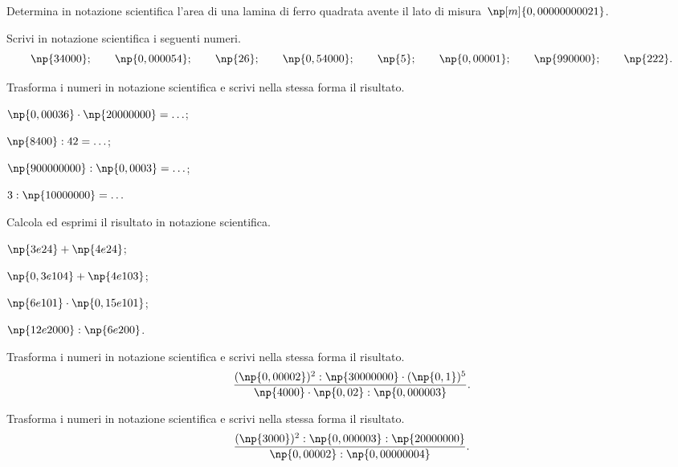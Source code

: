 \begin{esercizio}
 \label{ese:3.63}
Determina in notazione scientifica l'area di una lamina di ferro quadrata
avente il lato di misura~$\np[m]{0,00000000021}$.
\end{esercizio}

\begin{esercizio}
 \label{ese:3.64}
Scrivi in notazione scientifica i seguenti numeri.
\[\np{34000};\qquad\np{0,000054};\qquad\np{26};\qquad\np{0,54000};\qquad\np{5};\qquad\np{0,00001};\qquad\np{990000};\qquad\np{222}.\]
\end{esercizio}

\begin{esercizio}
 \label{ese:3.65}
Trasforma i numeri in notazione scientifica e scrivi nella stessa forma il risultato.
\begin{multicols}{2}
\begin{enumeratea}
\item $\np{0,00036}\cdot\np{20000000}=\ldots$;
\item $\np{8400}:42=\ldots$;
\item $\np{900000000}:\np{0,0003}=\ldots$;
\item $3:\np{10000000}=\ldots$
\end{enumeratea}
\end{multicols}
\end{esercizio}
\pagebreak
\begin{esercizio}
 \label{ese:3.66}
Calcola ed esprimi il risultato in notazione scientifica.
\begin{multicols}{2}
\begin{enumeratea}
\item $\np{3e24}+\np{4e24}$;
\item $\np{0,3e104}+\np{4e103}$;
\item $\np{6e101}\cdot\np{0,15e101}$;
\item $\np{12e2000}:\np{6e200}$.
\end{enumeratea}
\end{multicols}
\end{esercizio}

\begin{esercizio}[\Ast]
 \label{ese:3.67}
Trasforma i numeri in notazione scientifica e scrivi nella stessa forma il risultato.
\[\frac{(\np{0,00002})^2:\np{30000000} \cdot (\np{0,1})^5}{\np{4000} \cdot \np{0,02}:\np{0,000003}}.\]
\end{esercizio}

\begin{esercizio}[\Ast]
 \label{ese:3.68}
Trasforma i numeri in notazione scientifica e scrivi nella stessa forma il risultato.
\[\frac{(\np{3000})^2:\np{0,000003}:\np{20000000}}{\np{0,00002}:\np{0,00000004}}.\]
\end{esercizio}

